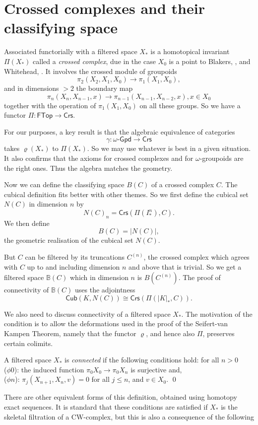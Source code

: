 \documentclass{elsarticle}
\def\FTop{\mathsf{FTop}}
\def\Cub{\mathsf{Cub}}
\def\Crs{\mathsf{Crs}}
\def\Crs{\mathsf{Crs}}
\def\Cub{\mathsf{Cub}}
\def\Crs{\mathsf{Crs}}
\def\Gpd{\mathsf{Gpd}}
\def\rho{\varrho}
\begin{document}
\section{ Crossed complexes and their classifying space}\label{sec:xmodclass}
Associated functorially with a filtered space $X_*$  is a homotopical invariant $\Pi(X_* )$  called a {\it crossed
complex}, due in the case $X_0 $  is a point to Blakers, \cite{Bl48}, and Whitehead, \cite{W49CHII}. It involves
the crossed module of groupoids
$$\pi_ 2 (X_ 2 , X_ 1 , X_0) \to \pi_1 (X _1 , X_0), $$
and in dimensions $> 2$  the boundary map
$$\pi_n (X_ n , X_ {n-1} , x) \to \pi_{ n-1} (X_{ n-1} , X_{ n-2} , x), x \in X_0$$
together with the operation of $\pi_ 1 (X _1 , X_ 0 )$  on all these groups. So we have a functor $\Pi :\FTop  \to \Crs$.

For our purposes, a key result is that the algebraic equivalence of categories $$\gamma  : \omega\text{-}\Gpd \to  \Crs$$  takes
$\rho(X _* )$  to $\Pi(X _* )$. So we may use whatever is best in a given situation. It also confirms that the axioms for crossed complexes and
for $\omega$-groupoids are the right ones. Thus the algebra matches the geometry.


Now we can define the classifying space $B(C)$ of a crossed complex $C$. The cubical definition
fits better with other themes. So we first define  the cubical set $N(C)$ in dimension $n$  by
$$N(C)_n= \Crs(\Pi(I^n_*),C).$$
We then define
$$B(C) = |N(C)|,$$
the geometric realisation of the cubical set $N(C)$.

But $C$ can be filtered by its truncations $C^ {(n)}$, the crossed complex which  agrees with $C$  up to and including
dimension $n$ and above that is trivial. So we get a filtered space $ \mathbb B (C)$ which in dimension $n$ is
$B(C^{ (n)})$. The proof of connectivity of $\mathbb B (C)$ uses the adjointness
$$\Cub(K, N(C)) \cong \Crs(\Pi(|K|_* , C)).$$

We also need to discuss connectivity of a filtered space $X_*$. The motivation of the condition is to allow the deformations used  in the proof of the Seifert-van Kampen Theorem, namely that the functor $\rho$, and hence also $\Pi$, preserves certain colimits.
\begin{Def}\label{Def:connfiltered}
  A filtered space $X_*$ is {\it connected} if the following conditions hold: for all $n > 0$ \\
  ($\phi 0$): the induced function $\pi_0 X_0 \to \pi_0 X_n$ is surjective and, \\
  ($\phi n$): $\pi_j(X_{n+1},X_n,v) =0 $ for all $j \leqslant  n$, and $v \in X_ 0$. \qed
\end{Def}
There are other equivalent forms of this definition, obtained using  homotopy exact sequences. It is standard that these conditions
are satisfied if $X_*$ is the skeletal filtration of a CW-complex, but this is also a consequence of the following
\end{document}
